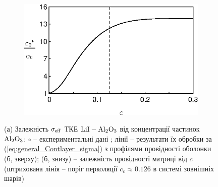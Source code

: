 \documentclass[twoside,a4paper,14pt]{vakaref}
\begin{document}
\begin{figure}[tb]
\begin{subfigure}[c]{0.35\textwidth}
		\includegraphics[width=\textwidth]{Liang-matrix-a06.eps}
		\caption{} \label{fig:Liang_LiI-Al2O3-Processing-b}
	\end{subfigure}%
	\caption{\label{fig:Liang_LiI-Al2O3-Processing} (а) Залежність $\sigma_{\rm eff}$ ТКЕ $\rm{LiI-Al_2O_3}$ від концентрації частинок $\rm Al_2O_3$: $\circ$ -- експериментальні дані \cite{Liang1973}; лінії -- результати їх обробки за (\ref{eq:general_Contlayer_sigma}) з профілями провідності оболонки (б, зверху); (б, знизу) -- залежність провідності матриці
		від $c$ (штрихована лінія -- поріг перколяції $c_{c} \approx 0.126$ в системі зовнішніх шарів)}
\vspace{-10pt}
\end{figure}
\end{document}
